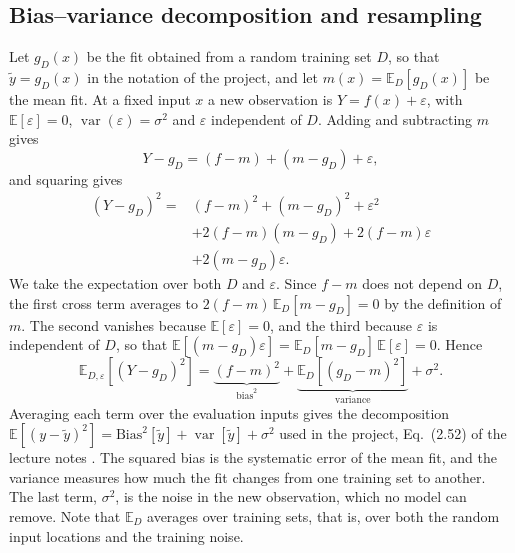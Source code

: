 \documentclass[aps,prb,reprint,superscriptaddress,nofootinbib,longbibliography,floatfix]{revtex4-2}
\newcommand{\E}{\mathbb{E}}
\begin{document}
\subsection{Bias--variance decomposition and resampling}\label{sec:biasvar_theory}\label{sec:resampling}
Let $g_D(x)$ be the fit obtained from a random training set $D$, so that $\tilde y=g_D(x)$ in the notation of the project, and let $m(x)=\E_D[g_D(x)]$ be the mean fit. At a fixed input $x$ a new observation is $Y=f(x)+\varepsilon$, with $\E[\varepsilon]=0$, $\operatorname{var}(\varepsilon)=\sigma^2$ and $\varepsilon$ independent of $D$. Adding and subtracting $m$ gives
\[
Y-g_D=(f-m)+(m-g_D)+\varepsilon,
\]
and squaring gives
\begin{align}
(Y-g_D)^2={}&(f-m)^2+(m-g_D)^2+\varepsilon^2\nonumber\\
&+2(f-m)(m-g_D)+2(f-m)\varepsilon\nonumber\\
&+2(m-g_D)\varepsilon .
\end{align}
We take the expectation over both $D$ and $\varepsilon$. Since $f-m$ does not depend on $D$, the first cross term averages to $2(f-m)\,\E_D[m-g_D]=0$ by the definition of $m$. The second vanishes because $\E[\varepsilon]=0$, and the third because $\varepsilon$ is independent of $D$, so that $\E[(m-g_D)\varepsilon]=\E_D[m-g_D]\,\E[\varepsilon]=0$. Hence
\begin{equation}
\E_{D,\varepsilon}[(Y-g_D)^2]
=\underbrace{(f-m)^2}_{\text{bias}^2}
+\underbrace{\E_D[(g_D-m)^2]}_{\text{variance}}+\sigma^2.
\label{eq:biasvar}
\end{equation}
Averaging each term over the evaluation inputs gives the decomposition $\E[(y-\tilde y)^2]=\mathrm{Bias}^2[\tilde y]+\operatorname{var}[\tilde y]+\sigma^2$ used in the project, Eq.~(2.52) of the lecture notes \cite[Sec.~2.10]{HjorthJensen2026}. The squared bias is the systematic error of the mean fit, and the variance measures how much the fit changes from one training set to another. The last term, $\sigma^2$, is the noise in the new observation, which no model can remove. Note that $\E_D$ averages over training sets, that is, over both the random input locations and the training noise.
\end{document}
